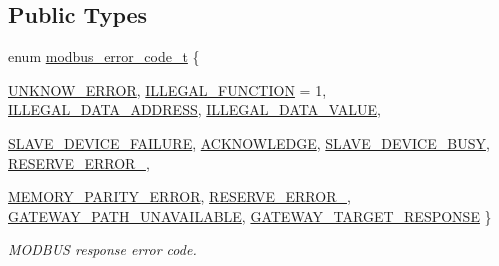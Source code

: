 \subsection*{Public Types}
\begin{DoxyCompactItemize}
\item 
enum \hyperlink{classmdt_frame_codec_modbus_a31d8291be7f8636d5d295ce3066d7ac7}{modbus\_\-error\_\-code\_\-t} \{ \par
\hyperlink{classmdt_frame_codec_modbus_a31d8291be7f8636d5d295ce3066d7ac7aab1a954c9125bbf1f79c69d480faec4b}{UNKNOW\_\-ERROR}, 
\hyperlink{classmdt_frame_codec_modbus_a31d8291be7f8636d5d295ce3066d7ac7aab0437de7413a72446c491f518249a0a}{ILLEGAL\_\-FUNCTION} =  1, 
\hyperlink{classmdt_frame_codec_modbus_a31d8291be7f8636d5d295ce3066d7ac7a1eeaee68c0cb3fc2c9dd26e9540c4fc3}{ILLEGAL\_\-DATA\_\-ADDRESS}, 
\hyperlink{classmdt_frame_codec_modbus_a31d8291be7f8636d5d295ce3066d7ac7a99ff0045d822da03e709508ce1acf85b}{ILLEGAL\_\-DATA\_\-VALUE}, 
\par
\hyperlink{classmdt_frame_codec_modbus_a31d8291be7f8636d5d295ce3066d7ac7aa458eaabf779b5936891a69d64eb05ac}{SLAVE\_\-DEVICE\_\-FAILURE}, 
\hyperlink{classmdt_frame_codec_modbus_a31d8291be7f8636d5d295ce3066d7ac7abcc3d663faf228569aea757d3c26611d}{ACKNOWLEDGE}, 
\hyperlink{classmdt_frame_codec_modbus_a31d8291be7f8636d5d295ce3066d7ac7afc6561ef2b014e3dd0e6ae2dd1d09201}{SLAVE\_\-DEVICE\_\-BUSY}, 
\hyperlink{classmdt_frame_codec_modbus_a31d8291be7f8636d5d295ce3066d7ac7ade44de70235367650161630c7dde3c4b}{RESERVE\_\-ERROR\_}, 
\par
\hyperlink{classmdt_frame_codec_modbus_a31d8291be7f8636d5d295ce3066d7ac7a82a7c52e774764f6b76d286bde96accf}{MEMORY\_\-PARITY\_\-ERROR}, 
\hyperlink{classmdt_frame_codec_modbus_a31d8291be7f8636d5d295ce3066d7ac7a956e96d465ca9152e77d09ee022b1a5f}{RESERVE\_\-ERROR\_}, 
\hyperlink{classmdt_frame_codec_modbus_a31d8291be7f8636d5d295ce3066d7ac7a8a4a5e81091eb2c57fd57dee450a2770}{GATEWAY\_\-PATH\_\-UNAVAILABLE}, 
\hyperlink{classmdt_frame_codec_modbus_a31d8291be7f8636d5d295ce3066d7ac7a9ca48eb9d1ab05850c36170e7dac0b99}{GATEWAY\_\-TARGET\_\-RESPONSE}
 \}
\begin{DoxyCompactList}\small\item\em MODBUS response error code. \end{DoxyCompactList}\end{DoxyCompactItemize}
